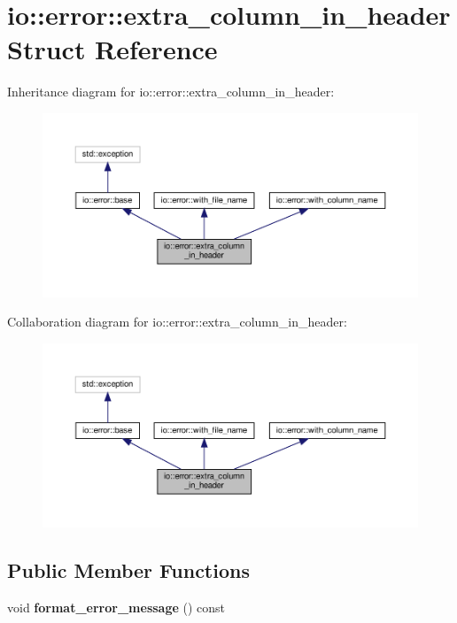 \hypertarget{structio_1_1error_1_1extra__column__in__header}{}\section{io\+:\+:error\+:\+:extra\+\_\+column\+\_\+in\+\_\+header Struct Reference}
\label{structio_1_1error_1_1extra__column__in__header}


Inheritance diagram for io\+:\+:error\+:\+:extra\+\_\+column\+\_\+in\+\_\+header\+:\nopagebreak
\begin{figure}[H]
\begin{center}
\leavevmode
\includegraphics[width=350pt]{structio_1_1error_1_1extra__column__in__header__inherit__graph}
\end{center}
\end{figure}


Collaboration diagram for io\+:\+:error\+:\+:extra\+\_\+column\+\_\+in\+\_\+header\+:\nopagebreak
\begin{figure}[H]
\begin{center}
\leavevmode
\includegraphics[width=350pt]{structio_1_1error_1_1extra__column__in__header__coll__graph}
\end{center}
\end{figure}
\subsection*{Public Member Functions}
\begin{DoxyCompactItemize}
\item 
\mbox{\label{structio_1_1error_1_1extra__column__in__header_ab7bb962a470c429206c51729fbf114dd}} 
void {\bfseries format\+\_\+error\+\_\+message} () const
\end{DoxyCompactItemize}
